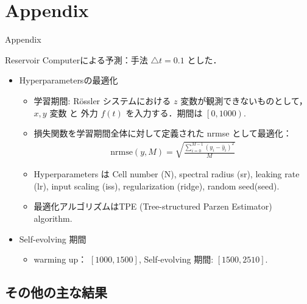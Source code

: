 \section{Appendix}

\begin{frame}
    \begin{center}
        \LARGE Appendix
    \end{center}
\end{frame}


\begin{frame}{Reservoir Computerによる予測：手法}
    $\triangle t = 0.1$ とした．
    \begin{itemize}
        \item Hyperparametersの最適化
        \begin{itemize}
            \item 学習期間: Rössler システムにおける $z$ 変数が観測できないものとして， $x, y$ 変数 と 外力 $f(t)$ を入力する．期間は $\left.\left[ 0, 1000 \right.\right).$ \vspace{.2em}
            \item 損失関数を学習期間全体に対して定義された nrmse として最適化：
            \vspace{.2em}
            \begin{align}
                \text{nrmse}(y, M) = \sqrt{\frac{\sum_{i=0}^{M-1}\left(y_i-\hat{y}_i\right)^2}{M}}
            \end{align}
            \item Hyperparameters は Cell number (N), spectral radius (sr), leaking rate (lr), input scaling (iss), regularization (ridge), random seed(seed). \vspace{.2em}
            \item 最適化アルゴリズムはTPE (Tree-structured Parzen Estimator) algorithm.
        \end{itemize}
        \item Self-evolving 期間
        \begin{itemize}
            \item warming up：
            $\left.\left[ 1000,  1500\right.\right]$, Self-evolving 期間: $\left[ 1500,  2510\right].$
        \end{itemize}
    \end{itemize}
\end{frame}


\subsection{その他の主な結果}


